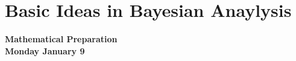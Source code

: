 \documentclass[11pt,fleqn]{book} %
\begin{document}


\chapter{Basic Ideas in Bayesian Anaylysis}



\textbf{Mathematical Preparation}\\

\textbf{Monday January 9}\\
\end{document}
